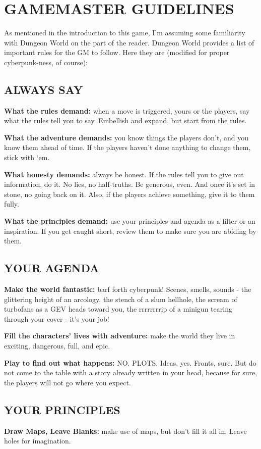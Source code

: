 \documentclass[oneside,10pt]{article}
\begin{document}
\section{GAMEMASTER GUIDELINES}
\begin{multicols}{2}
As mentioned in the introduction to this game, I’m assuming some familiarity with Dungeon World on the part of the
reader. Dungeon World provides a list of important rules for
the GM to follow. Here they are (modified for proper cyberpunk-ness, of course):


\subsection{ALWAYS SAY}
\textbf{What the rules demand:} when a move is triggered, yours
or the players, say what the rules tell you to say. Embellish
and expand, but start from the rules.

\textbf{What the adventure demands:} you know things the players don’t, and you know them ahead of time. If the players
haven’t done anything to change them, stick with
‘em.

\textbf{What honesty demands:} always be honest. If the rules tell
you to give out information, do it. No lies, no half-truths. Be
generous, even. And once it’s set in stone, no going back
on it. Also, if the players achieve something, give it to them
fully.

\textbf{What the principles demand:} use your principles and
agenda as a filter or an inspiration. If you get caught short,
review them to make sure you are abiding by them.
\subsection{YOUR AGENDA}
\textbf{Make the world fantastic:} barf forth cyberpunk! Scenes,
smells, sounds - the glittering height of an arcology, the
stench of a slum hellhole, the scream of turbofans as a GEV
heads toward you, the rrrrrrrrip of a minigun tearing through
your cover - it’s your job!

\textbf{Fill the characters’ lives with adventure:} make the world
they live in exciting, dangerous, full, and epic.

\textbf{Play to find out what happens:} NO. PLOTS. Ideas, yes.
Fronts, sure. But do not come to the table with a story already written in your head, because for sure, the players will
not go where you expect.
\subsection{YOUR PRINCIPLES}
\textbf{Draw Maps, Leave Blanks:} make use of maps, but don’t fill
it all in. Leave holes for imagination.


\end{multicols}
\end{document}
